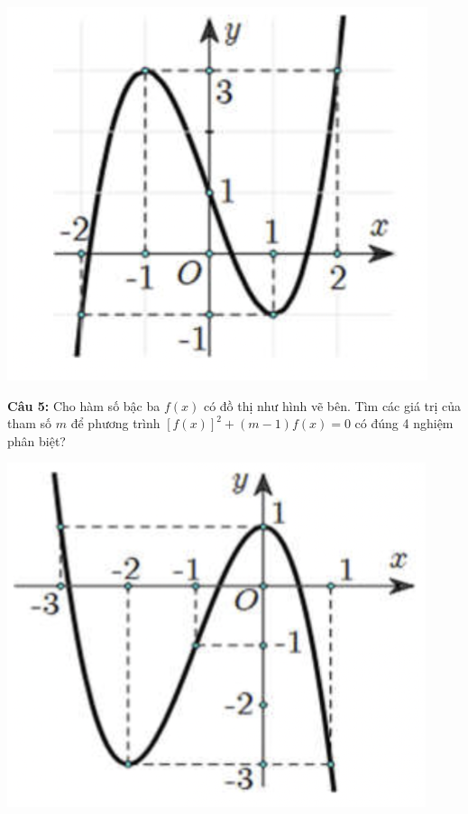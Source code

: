 \documentclass[12pt, a4paper]{article}
\begin{document}
\vspace{-0.6cm}

		\begin{center}
			\includegraphics[scale=0.6]{../images/tuonggiao_cau4.png}
		\end{center}
		
\vspace{-0.6cm}

		\textbf{Câu 5: } Cho hàm số bậc ba $f(x)$ có đồ thị như hình vẽ bên. Tìm các giá trị của tham số $m$ để phương trình $[f(x)]^2+(m-1)f(x)=0$ có đúng 4 nghiệm phân biệt?
		
\vspace{-0.6cm}		
		
			\begin{center}
				\includegraphics[scale=0.6]{../images/tuonggiao_cau5.png}
			\end{center}
\end{document}
